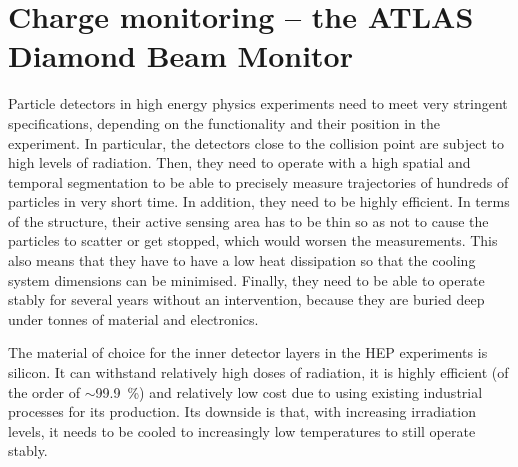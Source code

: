 \documentclass[12pt]{packages/mytustyle}  %
\begin{document}
\baselineskip=15pt



\chapter{Charge monitoring -- the ATLAS Diamond Beam Monitor}

%
%
%
%
%
%
%
%
%
%
%


Particle detectors in high energy physics experiments need to meet very stringent specifications, depending on the functionality and their position in the experiment. In particular, the detectors close to the collision point are subject to high levels of radiation. Then, they need to operate with a high spatial and temporal segmentation to be able to precisely measure trajectories of hundreds of particles in very short time. In addition, they need to be highly efficient. In terms of the structure, their active sensing area has to be thin so as not to cause the particles to scatter or get stopped, which would worsen the measurements. This also means that they have to have a low heat dissipation so that the cooling system dimensions can be minimised. Finally, they need to be able to operate stably for several years without an intervention, because they are buried deep under tonnes of material and electronics. 

The material of choice for the inner detector layers in the HEP experiments is silicon. It can withstand relatively high doses of radiation, it is highly efficient (of the order of $\sim$99.9~\%) and relatively low cost due to using existing industrial processes for its production. Its downside is that, with increasing irradiation levels, it needs to be cooled to increasingly low temperatures to still operate stably. 
\end{document}
